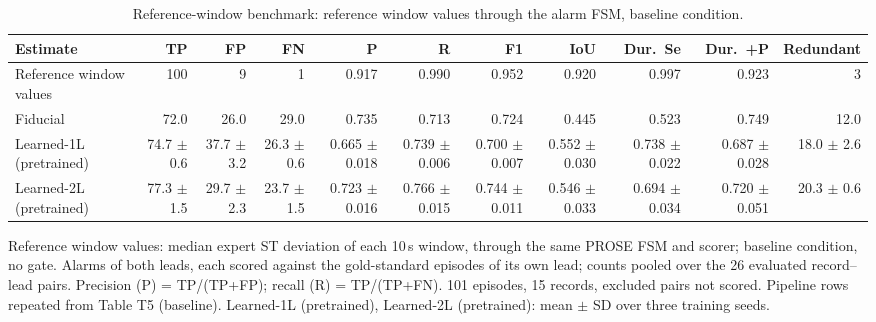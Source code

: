 \begin{table}[htbp]
\centering
\small
\caption{Reference-window benchmark: reference window values through the alarm FSM, baseline condition.}
\label{tab:t5b_reference_window}
\begin{tabular}{lrrrrrrrrrr}
\toprule
Estimate & TP & FP & FN & P & R & F1 & IoU & Dur.\ Se & Dur.\ +P & Redundant \\
\midrule
Reference window values & 100 & 9 & 1 & 0.917 & 0.990 & 0.952 & 0.920 & 0.997 & 0.923 & 3 \\
\midrule
Fiducial & 72.0 & 26.0 & 29.0 & 0.735 & 0.713 & 0.724 & 0.445 & 0.523 & 0.749 & 12.0 \\
Learned-1L (pretrained) & 74.7 $\pm$ 0.6 & 37.7 $\pm$ 3.2 & 26.3 $\pm$ 0.6 & 0.665 $\pm$ 0.018 & 0.739 $\pm$ 0.006 & 0.700 $\pm$ 0.007 & 0.552 $\pm$ 0.030 & 0.738 $\pm$ 0.022 & 0.687 $\pm$ 0.028 & 18.0 $\pm$ 2.6 \\
Learned-2L (pretrained) & 77.3 $\pm$ 1.5 & 29.7 $\pm$ 2.3 & 23.7 $\pm$ 1.5 & 0.723 $\pm$ 0.016 & 0.766 $\pm$ 0.015 & 0.744 $\pm$ 0.011 & 0.546 $\pm$ 0.033 & 0.694 $\pm$ 0.034 & 0.720 $\pm$ 0.051 & 20.3 $\pm$ 0.6 \\
\bottomrule
\end{tabular}

\par\smallskip\footnotesize Reference window values: median expert ST deviation of each 10\,s window, through the same PROSE FSM and scorer; baseline condition, no gate. Alarms of both leads, each scored against the gold-standard episodes of its own lead; counts pooled over the 26 evaluated record--lead pairs. Precision (P) = TP/(TP+FP); recall (R) = TP/(TP+FN). 101 episodes, 15 records, excluded pairs not scored. Pipeline rows repeated from Table T5 (baseline). Learned-1L (pretrained), Learned-2L (pretrained): mean $\pm$ SD over three training seeds.
\end{table}
